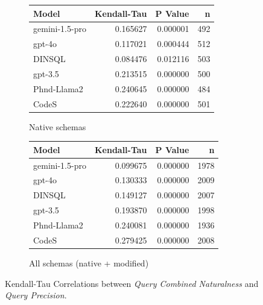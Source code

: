 \begin{figure}
  \centering
  \begin{subfigure}{.5\linewidth}
      \centering
      \begin{tabular}{lrrr}
\toprule
Model & Kendall-Tau & P Value & n \\
\midrule
gemini-1.5-pro & 0.165627 & 0.000001 & 492 \\
gpt-4o & 0.117021 & 0.000444 & 512 \\
DINSQL & 0.084476 & 0.012116 & 503 \\
gpt-3.5 & 0.213515 & 0.000000 & 500 \\
Phnd-Llama2 & 0.240645 & 0.000000 & 484 \\
CodeS & 0.222640 & 0.000000 & 501 \\
\bottomrule
\end{tabular}

      \caption{Native schemas}
      \label{table:precisionktaunative}
  \end{subfigure}%
  \begin{subfigure}{.5\linewidth}
      \centering
      \begin{tabular}{lrrr}
\toprule
Model & Kendall-Tau & P Value & n \\
\midrule
gemini-1.5-pro & 0.099675 & 0.000000 & 1978 \\
gpt-4o & 0.130333 & 0.000000 & 2009 \\
DINSQL & 0.149127 & 0.000000 & 2007 \\
gpt-3.5 & 0.193870 & 0.000000 & 1998 \\
Phnd-Llama2 & 0.240081 & 0.000000 & 1936 \\
CodeS & 0.279425 & 0.000000 & 2008 \\
\bottomrule
\end{tabular}

      \caption{All schemas (native + modified)}
      \label{table:precisionktauall}
  \end{subfigure}
  \caption{Kendall-Tau Correlations between \emph{Query Combined Naturalness} and \emph{Query Precision}.}
\end{figure}


